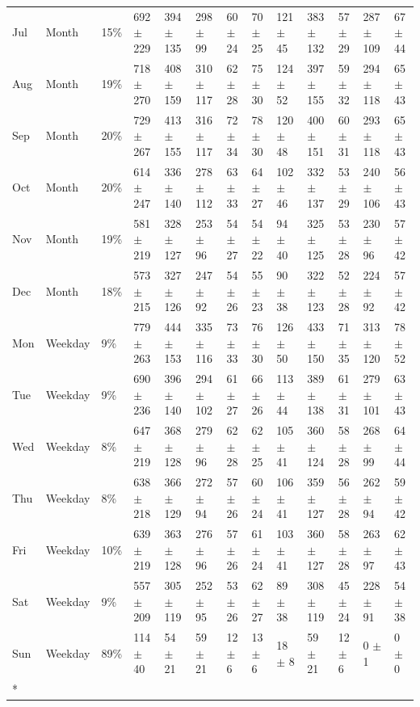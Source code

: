 \begin{longtable}[t]{lllllllllllll}
Jul & Month & 15\% & 692 $\pm$ 229 & 394 $\pm$ 135 & 298 $\pm$ 99 & 60 $\pm$ 24 & 70 $\pm$ 25 & 121 $\pm$ 45 & 383 $\pm$ 132 & 57 $\pm$ 29 & 287 $\pm$ 109 & 67 $\pm$ 44\\
Aug & Month & 19\% & 718 $\pm$ 270 & 408 $\pm$ 159 & 310 $\pm$ 117 & 62 $\pm$ 28 & 75 $\pm$ 30 & 124 $\pm$ 52 & 397 $\pm$ 155 & 59 $\pm$ 32 & 294 $\pm$ 118 & 65 $\pm$ 43\\
Sep & Month & 20\% & 729 $\pm$ 267 & 413 $\pm$ 155 & 316 $\pm$ 117 & 72 $\pm$ 34 & 78 $\pm$ 30 & 120 $\pm$ 48 & 400 $\pm$ 151 & 60 $\pm$ 31 & 293 $\pm$ 118 & 65 $\pm$ 43\\
Oct & Month & 20\% & 614 $\pm$ 247 & 336 $\pm$ 140 & 278 $\pm$ 112 & 63 $\pm$ 33 & 64 $\pm$ 27 & 102 $\pm$ 46 & 332 $\pm$ 137 & 53 $\pm$ 29 & 240 $\pm$ 106 & 56 $\pm$ 43\\
Nov & Month & 19\% & 581 $\pm$ 219 & 328 $\pm$ 127 & 253 $\pm$ 96 & 54 $\pm$ 27 & 54 $\pm$ 22 & 94 $\pm$ 40 & 325 $\pm$ 125 & 53 $\pm$ 28 & 230 $\pm$ 96 & 57 $\pm$ 42\\
Dec & Month & 18\% & 573 $\pm$ 215 & 327 $\pm$ 126 & 247 $\pm$ 92 & 54 $\pm$ 26 & 55 $\pm$ 23 & 90 $\pm$ 38 & 322 $\pm$ 123 & 52 $\pm$ 28 & 224 $\pm$ 92 & 57 $\pm$ 42\\
Mon & Weekday & 9\% & 779 $\pm$ 263 & 444 $\pm$ 153 & 335 $\pm$ 116 & 73 $\pm$ 33 & 76 $\pm$ 30 & 126 $\pm$ 50 & 433 $\pm$ 150 & 71 $\pm$ 35 & 313 $\pm$ 120 & 78 $\pm$ 52\\
Tue & Weekday & 9\% & 690 $\pm$ 236 & 396 $\pm$ 140 & 294 $\pm$ 102 & 61 $\pm$ 27 & 66 $\pm$ 26 & 113 $\pm$ 44 & 389 $\pm$ 138 & 61 $\pm$ 31 & 279 $\pm$ 101 & 63 $\pm$ 43\\
Wed & Weekday & 8\% & 647 $\pm$ 219 & 368 $\pm$ 128 & 279 $\pm$ 96 & 62 $\pm$ 28 & 62 $\pm$ 25 & 105 $\pm$ 41 & 360 $\pm$ 124 & 58 $\pm$ 28 & 268 $\pm$ 99 & 64 $\pm$ 44\\
Thu & Weekday & 8\% & 638 $\pm$ 218 & 366 $\pm$ 129 & 272 $\pm$ 94 & 57 $\pm$ 26 & 60 $\pm$ 24 & 106 $\pm$ 41 & 359 $\pm$ 127 & 56 $\pm$ 28 & 262 $\pm$ 94 & 59 $\pm$ 42\\
Fri & Weekday & 10\% & 639 $\pm$ 219 & 363 $\pm$ 128 & 276 $\pm$ 96 & 57 $\pm$ 26 & 61 $\pm$ 24 & 103 $\pm$ 41 & 360 $\pm$ 127 & 58 $\pm$ 28 & 263 $\pm$ 97 & 62 $\pm$ 43\\
Sat & Weekday & 9\% & 557 $\pm$ 209 & 305 $\pm$ 119 & 252 $\pm$ 95 & 53 $\pm$ 26 & 62 $\pm$ 27 & 89 $\pm$ 38 & 308 $\pm$ 119 & 45 $\pm$ 24 & 228 $\pm$ 91 & 54 $\pm$ 38\\
Sun & Weekday & 89\% & 114 $\pm$ 40 & 54 $\pm$ 21 & 59 $\pm$ 21 & 12 $\pm$ 6 & 13 $\pm$ 6 & 18 $\pm$ 8 & 59 $\pm$ 21 & 12 $\pm$ 6 & 0 $\pm$ 1 & 0 $\pm$ 0\\*
\end{longtable}
\endgroup{}
